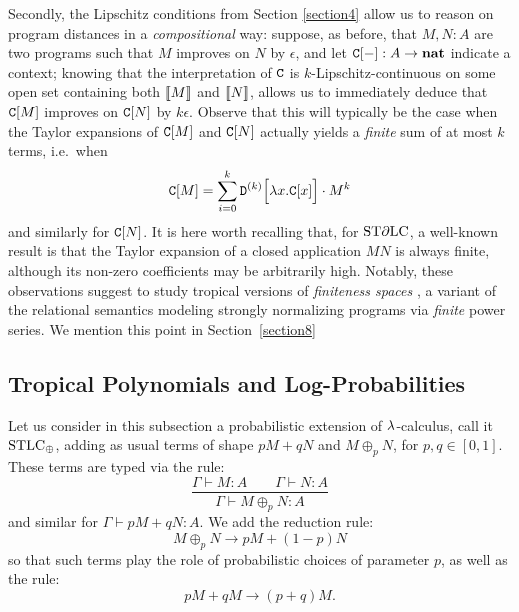 Secondly, the Lipschitz conditions from Section \ref{section4} allow us to reason on program distances in a \emph{compositional} way: suppose, as before, that $M,N:A$ are two programs such that $M$ improves on $N$ by $\epsilon$, and let $\mathtt{C}[-]:A \to \mathbf{nat}$ indicate a context; knowing that the interpretation of $\mathtt{C}$ is $k$-Lipschitz-continuous on some open set containing both $\llbracket M\rrbracket$ and $\llbracket N\rrbracket$, allows us to immediately deduce that $\mathtt{C}[M]$ improves on $\mathtt{C}[N]$ by $k \epsilon$. 
Observe that this will typically be the case when the Taylor expansions of $\mathtt{C}[M]$ and $\mathtt{C}[N]$ actually yields a \emph{finite} sum of at most $k$ terms, i.e.~when 
\begin{align}
\mathtt{C}[M] = \sum_{i=0}^{k} \mathtt{D}^{(k)}\Big[\lambda x.\mathtt{C}[x]\Big]\cdot M^{k}
\end{align}
and similarly for $\mathtt{C}[N]$. It is here worth recalling that, for $\mathrm{ST}\partial\mathrm{LC}$, a well-known result \cite{difflambda} is that the Taylor expansion of a closed application $MN$ is always finite, although its non-zero coefficients may be arbitrarily high. 
Notably, these observations suggest to study tropical versions of \emph{finiteness spaces} \cite{Ehrhard2005}, 
a variant of the relational semantics modeling strongly normalizing programs via \emph{finite} power series.
We mention this point in Section~\ref{section8}


\subsection{Tropical Polynomials and Log-Probabilities}

Let us consider in this subsection a probabilistic extension of $\lambda$-calculus, call it $\mathrm{STLC}_\oplus$, adding as usual terms of shape $pM+qN$ and $M\oplus_p N$, for $p,q\in[0,1]$.
These terms are typed via the rule:
\[
 \dfrac{\Gamma\vdash M:A \qquad \Gamma\vdash N:A}{\Gamma\vdash M\oplus_p N:A}
\]
and similar for $\Gamma\vdash pM+qN:A$.
We add the reduction rule:
\[
 M\oplus_p N \to pM+(1-p)N
\]
so that such terms play the role of probabilistic choices of parameter $p$, as well as the rule:
\[
 pM+qM\to (p+q)M.
\]

